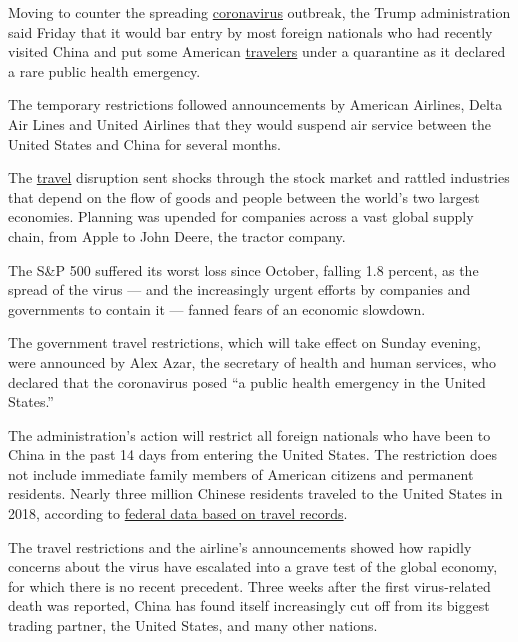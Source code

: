 Moving to counter the spreading
\href{https://www.nytimes3xbfgragh.onion/2020/02/10/business/china-coronavirus-philippines-travel.html}{coronavirus}
outbreak, the Trump administration said Friday that it would bar entry
by most foreign nationals who had recently visited China and put some
American
\href{https://www.nytimes3xbfgragh.onion/2020/02/10/business/china-coronavirus-philippines-travel.html}{travelers}
under a quarantine as it declared a rare public health emergency.

The temporary restrictions followed announcements by American Airlines,
Delta Air Lines and United Airlines that they would suspend air service
between the United States and China for several months.

The
\href{https://www.nytimes3xbfgragh.onion/2020/02/10/business/china-coronavirus-philippines-travel.html}{travel}
disruption sent shocks through the stock market and rattled industries
that depend on the flow of goods and people between the world's two
largest economies. Planning was upended for companies across a vast
global supply chain, from Apple to John Deere, the tractor company.

The S\&P 500 suffered its worst loss since October, falling 1.8 percent,
as the spread of the virus --- and the increasingly urgent efforts by
companies and governments to contain it --- fanned fears of an economic
slowdown.

The government travel restrictions, which will take effect on Sunday
evening, were announced by Alex Azar, the secretary of health and human
services, who declared that the coronavirus posed ``a public health
emergency in the United States.''

The administration's action will restrict all foreign nationals who have
been to China in the past 14 days from entering the United States. The
restriction does not include immediate family members of American
citizens and permanent residents. Nearly three million Chinese residents
traveled to the United States in 2018, according to
\href{https://travel.trade.gov/view/m-2017-I-001/index.asp}{federal data
based on travel records}.

The travel restrictions and the airline's announcements showed how
rapidly concerns about the virus have escalated into a grave test of the
global economy, for which there is no recent precedent. Three weeks
after the first virus-related death was reported, China has found itself
increasingly cut off from its biggest trading partner, the United
States, and many other nations.

